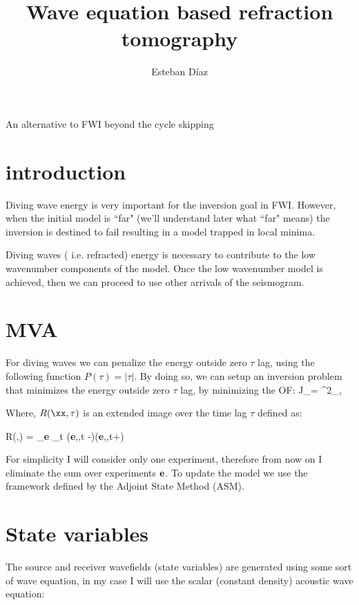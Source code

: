 

\author{Esteban D\'{i}az}
\title{Wave equation based refraction tomography}{An alternative to FWI beyond the cycle skipping}


\section{introduction}
Diving wave energy is very important for the inversion goal in FWI. However, when the initial model is ``far" (we'll understand 
later what ``far" means) the inversion is destined to fail resulting in a model trapped in local minima.

Diving waves ( i.e. refracted) energy is necessary to contribute to the low wavenumber components of the model. Once the low wavenumber
model is achieved, then we can proceed to use other arrivals of the seismogram.





\section{MVA}

For diving waves we can penalize the energy outside zero $\tau$ lag, using the following function $P(\tau)=|\tau|$. By doing so, we can setup an 
inversion problem that minimizes the energy outside zero $\tau$ lag, by minimizing the OF:
\beq
J_\tau =  ^2_{\xx,\tau}
\label{eq:OF}
\eeq

Where, $R(\xx,\tau)$ is an extended image over the time lag $\tau$ defined as:

\beq
R(\xx,\tau) = \sum_{\bf e} \sum_t \US({\bf e},\xx,t -\tau)\UR({\bf e},\xx,t+\tau)
\label{eq:eic}
\eeq

For simplicity I will consider only one experiment, therefore from now on I eliminate the  sum over experiments $\bf e$.
To update the model we use the framework defined by the Adjoint State Method (ASM). 

\section{State variables}

The source and receiver wavefields (state variables) are generated using some sort of wave equation, in my case I will 
use the scalar (constant density) acoustic wave equation:

